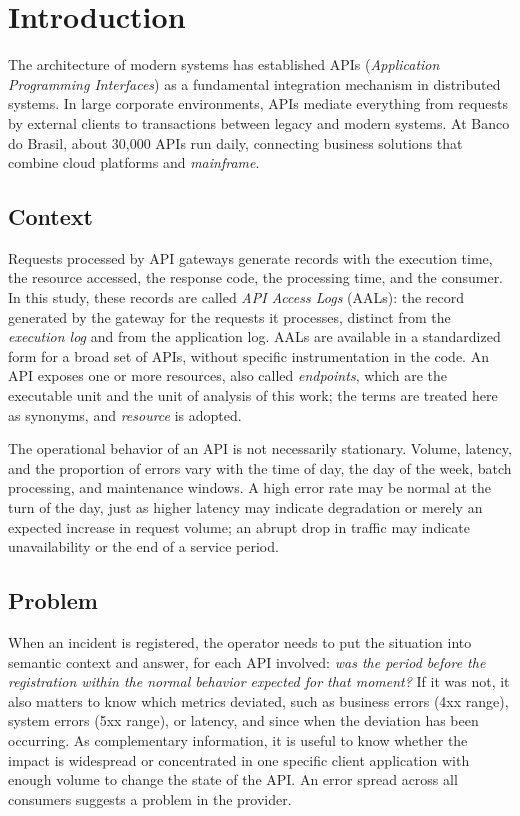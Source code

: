 \documentclass[sigconf,nonacm]{acmart}
\begin{document}
\section{Introduction}

The architecture of modern systems has established APIs (\emph{Application Programming Interfaces}) as a fundamental integration mechanism in distributed systems. In large corporate environments, APIs mediate everything from requests by external clients to transactions between legacy and modern systems. At Banco do Brasil, about 30,000 APIs run daily, connecting business solutions that combine cloud platforms and \emph{mainframe}.

\subsection{Context}

Requests processed by API gateways generate records with the execution time, the resource accessed, the response code, the processing time, and the consumer. In this study, these records are called \emph{API Access Logs} (AALs): the record generated by the gateway for the requests it processes, distinct from the \emph{execution log} and from the application log. AALs are available in a standardized form for a broad set of APIs, without specific instrumentation in the code. An API exposes one or more resources, also called \emph{endpoints}, which are the executable unit and the unit of analysis of this work; the terms are treated here as synonyms, and \emph{resource} is adopted.

The operational behavior of an API is not necessarily stationary. Volume, latency, and the proportion of errors vary with the time of day, the day of the week, batch processing, and maintenance windows. A high error rate may be normal at the turn of the day, just as higher latency may indicate degradation or merely an expected increase in request volume; an abrupt drop in traffic may indicate unavailability or the end of a service period.

\subsection{Problem}
When an incident is registered, the operator needs to put the situation into semantic context and answer, for each API involved: \emph{was the period before the registration within the normal behavior expected for that moment?} If it was not, it also matters to know which metrics deviated, such as business errors (4xx range), system errors (5xx range), or latency, and since when the deviation has been occurring. As complementary information, it is useful to know whether the impact is widespread or concentrated in one specific client application with enough volume to change the state of the API. An error spread across all consumers suggests a problem in the provider.
\end{document}
